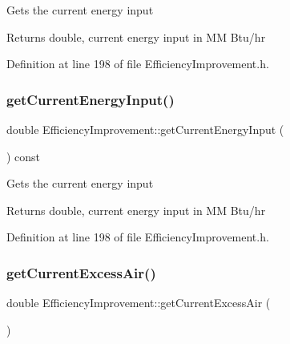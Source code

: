 Gets the current energy input

\begin{DoxyReturn}{Returns}
double, current energy input in MM Btu/hr 
\end{DoxyReturn}


Definition at line 198 of file Efficiency\+Improvement.\+h.

\mbox{\label{class_efficiency_improvement_a8fcbdd3085f0a8b1120fb699522fcc05}} 
\subsubsection{\texorpdfstring{get\+Current\+Energy\+Input()}{getCurrentEnergyInput()}\hspace{0.1cm}{\footnotesize\ttfamily [3/3]}}
{\footnotesize\ttfamily double Efficiency\+Improvement\+::get\+Current\+Energy\+Input (\begin{DoxyParamCaption}{ }\end{DoxyParamCaption}) const\hspace{0.3cm}{\ttfamily [inline]}}

Gets the current energy input

\begin{DoxyReturn}{Returns}
double, current energy input in MM Btu/hr 
\end{DoxyReturn}


Definition at line 198 of file Efficiency\+Improvement.\+h.

\mbox{\label{class_efficiency_improvement_a42cd83e1c57f065077e31f21b3552a76}} 
\subsubsection{\texorpdfstring{get\+Current\+Excess\+Air()}{getCurrentExcessAir()}\hspace{0.1cm}{\footnotesize\ttfamily [1/3]}}
{\footnotesize\ttfamily double Efficiency\+Improvement\+::get\+Current\+Excess\+Air (\begin{DoxyParamCaption}{ }\end{DoxyParamCaption})}

